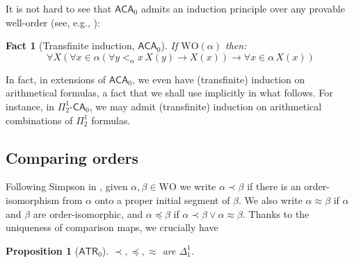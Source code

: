 \documentclass[10pt,a4paper]{amsart}
\theoremstyle{plain}
\newtheorem{proposition}[proposition]{Proposition}
\newtheorem{fact}[fact]{Fact}
\theoremstyle{definition}
\newtheorem{remark}[remark]{Remark}
\newcommand{\anupam}[1]{\todo[color=green]{A: #1}}
\renewcommand{\todo}[1]{}
\renewcommand{\anupam}[1]{}
\theoremstyle{plain}
\theoremstyle{definition} %
\renewcommand{\lor}{\vee}
\renewcommand{\land}{\wedge}
\newcommand{\limp}{\to}
\newcommand{\Sin}[2]{\Sigma^{#1}_{#2}}
\newcommand{\Pin}[2]{\Pi^{#1}_{#2}}
\newcommand{\Din}[2]{\Delta^{#1}_{#2}}
\newcommand{\CA}{\mathsf{CA}}
\newcommand{\ca}[1]{#1\text{-}\CA}
\newcommand{\PSCA}{\ca{\Pin 1 2 }_0}
\newcommand{\ACA}{\mathsf{ACA}_0}
\newcommand{\ATR}{\mathsf{ATR}}
\newcommand{\WO}{\mathrm{WO}}
\newcommand{\ordleq}{\preceq}
\newcommand{\ordlneq}{\prec}
\newcommand{\ordeq}{\approx}
\begin{document}
It is not hard to see that $\ACA$ admits an induction principle over any provable well-order (see, e.g., \cite{Simpson99:monograph}):
\begin{fact}
[Transfinite induction, $\ACA$]
\label{fact:wo-ind-in-aca}
If $\WO(\alpha)$ then:
\[
\forall X (\forall x\in \alpha (\forall y<_\alpha x\,  X(y) \limp X(x)) \limp \forall x \in \alpha\,  X(x))
\]
\end{fact}
In fact, in extensions of $\ACA$, we even have (transfinite) induction on arithmetical formulas, a fact that we shall use implicitly in what follows.
For instance, in $\PSCA$, we may admit (transfinite) induction on arithmetical combinations of $\Pin 1 2 $ formulas.
\anupam{check this again}

\subsection{Comparing orders}
Following Simpson in \cite{Simpson99:monograph},
given $\alpha,\beta \in \WO$ we write $\alpha \ordlneq \beta$ if there is an order-isomorphism from $\alpha$ onto a proper initial segment of $\beta $. We also write $\alpha \ordeq \beta$ if $\alpha $ and $\beta $ are order-isomorphic, and $\alpha \ordleq \beta $ if $\alpha \ordlneq \beta \lor \alpha \ordeq \beta$.
Thanks to the uniqueness of comparison maps, we crucially have

\begin{proposition}
[$\ATR_0$]
    $\ordlneq, \ordleq, \ordeq$ are $\Din 1 1 $.
\end{proposition}
    



\anupam{commented remark above, it seems obsolete and incorrect now (since we follow Simpson's `strong comparison').}
\end{document}
